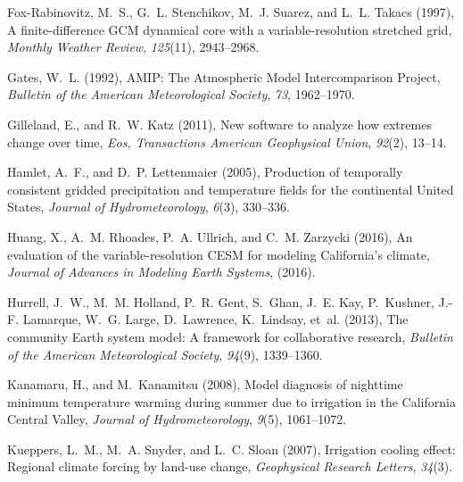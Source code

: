 \documentclass[draft,ms]{agutex}   %
\begin{document}
\begin{article}
\begin{thebibliography}{43}
Fox-Rabinovitz, M.~S., G.~L. Stenchikov, M.~J. Suarez, and L.~L. Takacs (1997),
  {A finite-difference GCM dynamical core with a variable-resolution stretched
  grid}, \textit{Monthly Weather Review}, \textit{125}(11), 2943--2968.

{Gates}, W.~L. (1992), {AMIP: The Atmospheric Model Intercomparison Project},
  \textit{Bulletin of the American Meteorological Society}, \textit{73},
  1962--1970.

Gilleland, E., and R.~W. Katz (2011), New software to analyze how extremes
  change over time, \textit{Eos, Transactions American Geophysical Union},
  \textit{92}(2), 13--14.

Hamlet, A.~F., and D.~P. Lettenmaier (2005), {Production of temporally
  consistent gridded precipitation and temperature fields for the continental
  United States}, \textit{Journal of Hydrometeorology}, \textit{6}(3),
  330--336.

Huang, X., A.~M. Rhoades, P.~A. Ullrich, and C.~M. Zarzycki (2016), {An
  evaluation of the variable-resolution CESM for modeling California's
  climate}, \textit{Journal of Advances in Modeling Earth Systems}, (2016).

Hurrell, J.~W., M.~M. Holland, P.~R. Gent, S.~Ghan, J.~E. Kay, P.~Kushner,
  J.-F. Lamarque, W.~G. Large, D.~Lawrence, K.~Lindsay, et~al. (2013), {The
  community Earth system model: A framework for collaborative research},
  \textit{Bulletin of the American Meteorological Society}, \textit{94}(9),
  1339--1360.

Kanamaru, H., and M.~Kanamitsu (2008), {Model diagnosis of nighttime minimum
  temperature warming during summer due to irrigation in the California Central
  Valley}, \textit{Journal of Hydrometeorology}, \textit{9}(5), 1061--1072.

Kueppers, L.~M., M.~A. Snyder, and L.~C. Sloan (2007), Irrigation cooling
  effect: Regional climate forcing by land-use change, \textit{Geophysical
  Research Letters}, \textit{34}(3).


\end{thebibliography}
\end{article}
\end{document}
